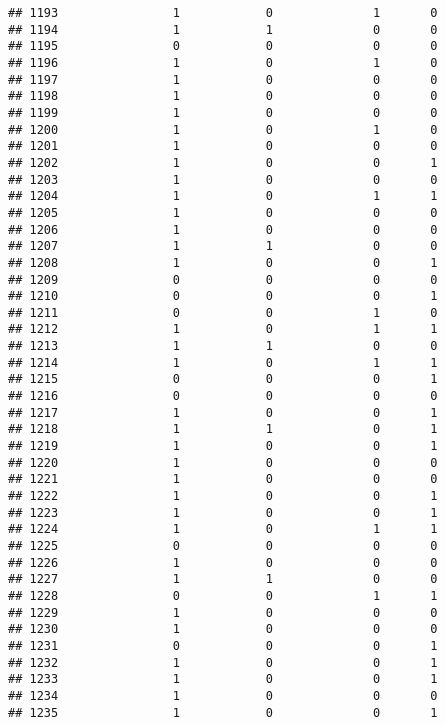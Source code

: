 \documentclass[]{article}
\begin{document}
\begin{verbatim}
## 1193                1            0              1       0
## 1194                1            1              0       0
## 1195                0            0              0       0
## 1196                1            0              1       0
## 1197                1            0              0       0
## 1198                1            0              0       0
## 1199                1            0              0       0
## 1200                1            0              1       0
## 1201                1            0              0       0
## 1202                1            0              0       1
## 1203                1            0              0       0
## 1204                1            0              1       1
## 1205                1            0              0       0
## 1206                1            0              0       0
## 1207                1            1              0       0
## 1208                1            0              0       1
## 1209                0            0              0       0
## 1210                0            0              0       1
## 1211                0            0              1       0
## 1212                1            0              1       1
## 1213                1            1              0       0
## 1214                1            0              1       1
## 1215                0            0              0       1
## 1216                0            0              0       0
## 1217                1            0              0       1
## 1218                1            1              0       1
## 1219                1            0              0       1
## 1220                1            0              0       0
## 1221                1            0              0       0
## 1222                1            0              0       1
## 1223                1            0              0       1
## 1224                1            0              1       1
## 1225                0            0              0       0
## 1226                1            0              0       0
## 1227                1            1              0       0
## 1228                0            0              1       1
## 1229                1            0              0       0
## 1230                1            0              0       0
## 1231                0            0              0       1
## 1232                1            0              0       1
## 1233                1            0              0       1
## 1234                1            0              0       0
## 1235                1            0              0       1

\end{verbatim}
\end{document}
